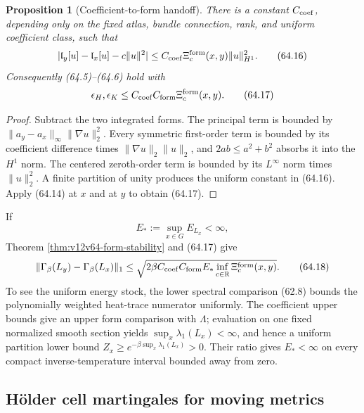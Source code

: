 \documentclass[11pt]{article}
\newtheorem{proposition}[theorem]{Proposition}
\theoremstyle{remark}
\begin{document}
\begin{proposition}[Coefficient-to-form handoff]
\label{prop:v12v64-coefficient}
There is a constant \(C_{\rm coef}\), depending only on the fixed
atlas, bundle connection, rank, and uniform coefficient class, such
that
\begin{equation}
 |\mathfrak l_y[u]-\mathfrak l_x[u]-c\|u\|^2|
 \leq
 C_{\rm coef}\Xi_c^{\rm form}(x,y)\|u\|_{H^1}^2.  \tag{64.16}
\end{equation}
Consequently (64.5)--(64.6) hold with
\begin{equation}
 \epsilon_H,\epsilon_K
 \leq
 C_{\rm coef}C_{\rm form}
 \Xi_c^{\rm form}(x,y).                           \tag{64.17}
\end{equation}
\end{proposition}

\begin{proof}
Subtract the two integrated forms.  The principal term is bounded
by
\(\|a_y-a_x\|_\infty\|\nabla u\|_2^2\).
Every symmetric first-order term is bounded by its coefficient
difference times \(\|\nabla u\|_2\|u\|_2\), and
\(2ab\leq a^2+b^2\) absorbs it into the \(H^1\) norm.  The centered
zeroth-order term is bounded by its \(L^\infty\) norm times
\(\|u\|_2^2\).  A finite partition of unity produces the uniform
constant in (64.16).  Apply (64.14) at \(x\) and at \(y\) to obtain
(64.17).
\end{proof}

If
\[
                         E_*:=\sup_{x\in G}E_{L_x}<\infty,
\]
Theorem \ref{thm:v12v64-form-stability} and (64.17) give
\begin{equation}
 \|\Gamma_\beta(L_y)-\Gamma_\beta(L_x)\|_1
 \leq
 \sqrt{
 2\beta C_{\rm coef}C_{\rm form}E_*
 \inf_{c\in\mathbb R}\Xi_c^{\rm form}(x,y)}.       \tag{64.18}
\end{equation}
To see the uniform energy stock, the lower spectral comparison
(62.8) bounds the polynomially weighted heat-trace numerator
uniformly.  The coefficient upper bounds give an upper form
comparison with \(\Lambda\); evaluation on one fixed normalized
smooth section yields \(\sup_x\lambda_1(L_x)<\infty\), and hence a
uniform partition lower bound
\(Z_x\geq e^{-\beta\sup_x\lambda_1(L_x)}>0\).  Their ratio gives
\(E_*<\infty\) on every compact inverse-temperature interval bounded
away from zero.

\subsection{Hölder cell martingales for moving metrics}
\end{document}
